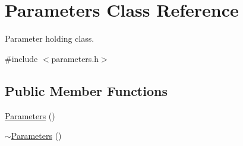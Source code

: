 \hypertarget{class_parameters}{}\section{Parameters Class Reference}
\label{class_parameters}


Parameter holding class.  




{\ttfamily \#include $<$parameters.\+h$>$}

\subsection*{Public Member Functions}
\begin{DoxyCompactItemize}
\item 
\mbox{\hyperlink{class_parameters_af4d94ee360ac0157d9065f78797fe9a1}{Parameters}} ()
\item 
\mbox{\hyperlink{class_parameters_a640a1a349975a8cb023696f25e563a5c}{$\sim$\+Parameters}} ()
\end{DoxyCompactItemize}
